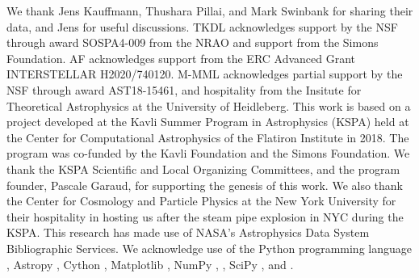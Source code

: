 \IfFileExists{emulateapjlegacy.cls}{\documentclass[iop]{emulateapjlegacy}}{\documentclass[iop]{emulateapj}}
\begin{document}
We thank Jens Kauffmann, Thushara Pillai, and Mark Swinbank for sharing their data, and Jens for useful discussions.
%
TKDL acknowledges support by the NSF through award SOSPA4-009 from the NRAO and support from the Simons Foundation.
%
AF acknowledges support from the ERC Advanced Grant INTERSTELLAR
H2020/740120.
    M-MML acknowledges partial support by the NSF through award
    AST18-15461, and hospitality from the Insitute for Theoretical
    Astrophysics at the University of Heidleberg.
%
This work is based on a project developed at the Kavli Summer Program in Astrophysics (KSPA) held at the Center for Computational Astrophysics of the Flatiron Institute in 2018. The program was co-funded by the Kavli Foundation and the Simons Foundation.
%
We thank the KSPA Scientific and Local Organizing Committees, and the program founder, Pascale Garaud, for supporting the genesis of this work.
%
We also thank the Center for Cosmology and Particle Physics at the New York University for their hospitality in hosting us after the steam pipe explosion in NYC during the KSPA.
%
This research has made use of NASA's Astrophysics Data System Bibliographic Services.
%
We acknowledge use of the Python programming language \citep{VanRossum1991}, Astropy \citep{astropy}, Cython \citep{behnel2010cython}, Matplotlib \citep{Hunter2007}, NumPy \citep{VanDerWalt2011},  \citep{Labadens2012}, SciPy \citep{scipyref}, and  \citep{Smith09a,Turk11a}.
%



\end{document}
